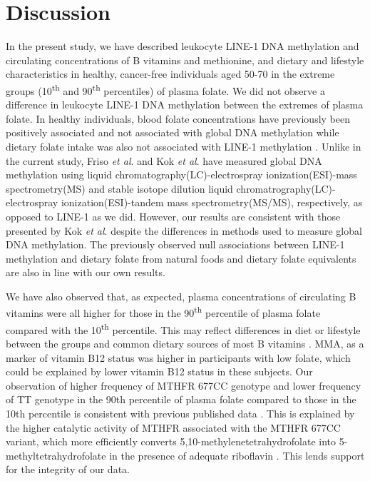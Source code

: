 \section[]{Discussion} %
\noindent In the present study, we have described leukocyte LINE-1 DNA methylation and circulating concentrations of B vitamins and methionine, and dietary and lifestyle characteristics in healthy, cancer-free individuals aged 50-70 in the extreme groups (10\textsuperscript{th} and 90\textsuperscript{th} percentiles) of plasma folate. We did not observe a difference in leukocyte LINE-1 DNA methylation between the extremes of plasma folate. In healthy individuals, blood folate concentrations have previously been positively associated \cite{c318} and not associated with global DNA methylation \cite{c319} while dietary folate intake was also not associated with LINE-1 methylation \cite{c317}. Unlike in the current study, Friso \emph{et al}. \cite{c318} and Kok \emph{et al}. \cite{c319} have measured global DNA methylation using liquid chromatography(LC)-electrospray ionization(ESI)-mass spectrometry(MS) and stable isotope dilution liquid chromatrography(LC)-electrospray ionization(ESI)-tandem mass spectrometry(MS/MS), respectively, as opposed to LINE-1 as we did. However, our results are consistent with those presented by Kok \emph{et al}. despite the differences in methods used to measure global DNA methylation. The previously observed null associations between LINE-1 methylation and dietary folate from natural foods and dietary folate equivalents \cite{c317} are also in line with our own results.

\noindent We have also observed that, as expected, plasma concentrations of circulating B vitamins were all higher for those in the 90\textsuperscript{th} percentile of plasma folate compared with the 10\textsuperscript{th} percentile. This may reflect differences in diet or lifestyle between the groups and common dietary sources of most B vitamins \cite{c329}. MMA, as a marker of vitamin B12 status \cite{c330} was higher in participants with low folate, which could be explained by lower vitamin B12 status in these subjects. Our observation of higher frequency of MTHFR 677CC genotype and lower frequency of TT genotype in the 90th percentile of plasma folate compared to those in the 10th percentile is consistent with previous published data \cite{c318}. This is explained by the higher catalytic activity of MTHFR associated with the MTHFR 677CC variant, which more efficiently converts 5,10-methylenetetrahydrofolate into 5-methyltetrahydrofolate in the presence of adequate riboflavin \cite{c318}. This lends 
support for the integrity of our data.


